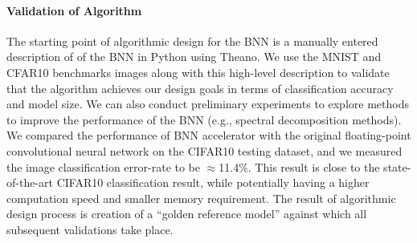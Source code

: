 \paragraph{Validation of Algorithm}
The starting point of algorithmic design for the BNN is a manually
entered description of of the BNN in Python using Theano. We use the
MNIST and CFAR10 benchmarks images along with this high-level description
to validate that the algorithm achieves our design goals in terms of
classification accuracy and model size. We can also conduct preliminary
experiments to explore methods to improve the performance of the BNN
(e.g., spectral decomposition methods). We compared the performance of
BNN accelerator with the original floating-point convolutional neural
network on the CIFAR10 testing dataset, and we measured the image
classification error-rate to be $\approx$11.4\%.  This result is close to the state-of-the-art CIFAR10
classification result, while potentially having a higher computation
speed and smaller memory requirement. The result of algorithmic design
process is creation of a ``golden reference model'' against which all
subsequent validations take place.




